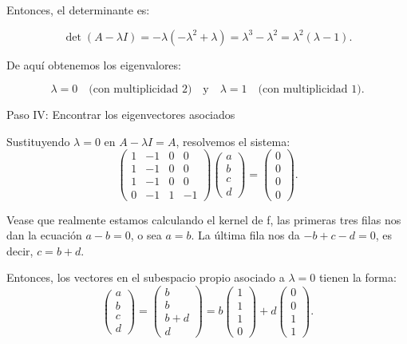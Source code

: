 \documentclass{article}
\begin{document}
Entonces, el determinante es:

\[
\det(A - \lambda I) = -\lambda (-\lambda^2 + \lambda) = \lambda^3 - \lambda^2 = \lambda^2(\lambda - 1).
\]

De aquí obtenemos los eigenvalores:

\[
\lambda = 0 \quad \text{(con multiplicidad 2)} \quad \text{y} \quad \lambda = 1 \quad \text{(con multiplicidad 1)}.
\]

Paso IV: Encontrar los eigenvectores asociados

Sustituyendo \( \lambda = 0 \) en \( A - \lambda I = A \), resolvemos el sistema:
\[
\begin{pmatrix} 1 & -1 & 0 & 0 \\ 1 & -1 & 0 & 0 \\ 1 & -1 & 0 & 0 \\ 0 & -1 & 1 & -1 \end{pmatrix} \begin{pmatrix} a \\ b \\ c \\ d \end{pmatrix} = \begin{pmatrix} 0 \\ 0 \\ 0 \\ 0 \end{pmatrix}.
\]

Vease que realmente estamos calculando el kernel de f, las primeras tres filas nos dan la ecuación \( a - b = 0 \), o sea \( a = b \). La última fila nos da \( -b + c - d = 0 \), es decir, \( c = b + d \).

Entonces, los vectores en el subespacio propio asociado a \( \lambda = 0 \) tienen la forma:
\[
\begin{pmatrix} a \\ b \\ c \\ d \end{pmatrix} = \begin{pmatrix} b \\ b \\ b + d \\ d \end{pmatrix} = b \begin{pmatrix} 1 \\ 1 \\ 1 \\ 0 \end{pmatrix} + d \begin{pmatrix} 0 \\ 0 \\ 1 \\ 1 \end{pmatrix}.
\]
\end{document}
